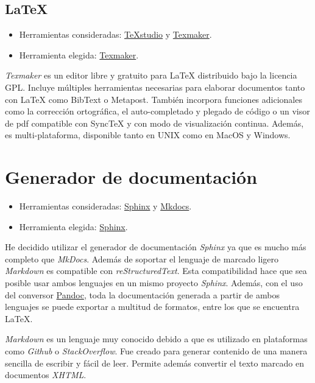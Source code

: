 \documentclass[
]{article}
\providecommand{\tightlist}{%
  \setlength{\itemsep}{0pt}\setlength{\parskip}{0pt}}
\begin{document}
\hypertarget{latex}{%
\subsection{LaTeX}\label{latex}}

\begin{itemize}
\tightlist
\item
  Herramientas consideradas:
  \href{https://www.texstudio.org/}{TeXstudio} y
  \href{http://www.xm1math.net/texmaker/}{Texmaker}.
\item
  Herramienta elegida:
  \href{http://www.xm1math.net/texmaker/}{Texmaker}.
\end{itemize}

\emph{Texmaker} es un editor libre y gratuito para LaTeX distribuido
bajo la licencia GPL. Incluye múltiples herramientas necesarias para
elaborar documentos tanto con LaTeX como BibText o Metapost. También
incorpora funciones adicionales como la corrección ortográfica, el
auto-completado y plegado de código o un visor de pdf compatible con
SyncTeX y con modo de visualización continua. Además, es
multi-plataforma, disponible tanto en UNIX como en MacOS y Windows.

\hypertarget{generador-de-documentaciuxf3n}{%
\section{Generador de
documentación}\label{generador-de-documentaciuxf3n}}

\begin{itemize}
\tightlist
\item
  Herramientas consideradas:
  \href{https://www.sphinx-doc.org/es/master/index.html}{Sphinx} y
  \href{https://www.mkdocs.org/}{Mkdocs}.
\item
  Herramienta elegida:
  \href{https://www.sphinx-doc.org/es/master/index.html}{Sphinx}.
\end{itemize}

He decidido utilizar el generador de documentación \emph{Sphinx} ya que
es mucho más completo que \emph{MkDocs}. Además de soportar el lenguaje
de marcado ligero \emph{Markdown} es compatible con
\emph{reStructuredText}. Esta compatibilidad hace que sea posible usar
ambos lenguajes en un mismo proyecto \emph{Sphinx}. Además, con el uso
del conversor \href{http://pandoc.org/}{Pandoc}, toda la documentación
generada a partir de ambos lenguajes se puede exportar a multitud de
formatos, entre los que se encuentra LaTeX.

\emph{Markdown} es un lenguaje muy conocido debido a que es utilizado en
plataformas como \emph{Github} o \emph{StackOverflow}. Fue creado para
generar contenido de una manera sencilla de escribir y fácil de leer.
Permite además convertir el texto marcado en documentos \emph{XHTML}.
\end{document}
